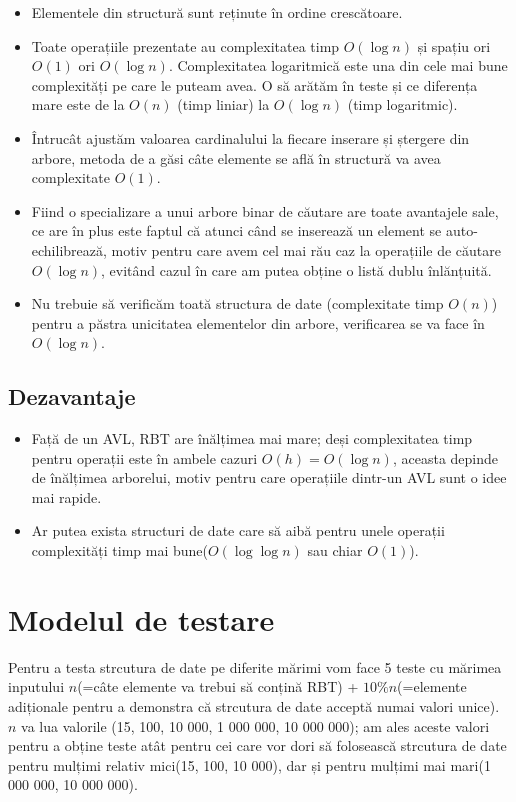 \documentclass[]{report}
\begin{document}
	\begin{itemize}
		\item Elementele din structură sunt reținute în ordine crescătoare.
		\item Toate operațiile prezentate au complexitatea timp $O(\log n)$ și
			spațiu ori $O(1)$ ori $O(\log n)$. Complexitatea logaritmică este una
			din cele mai bune complexități pe care le puteam avea. O să arătăm
			în teste și ce diferența mare este de la $O(n)$ (timp liniar) la
			$O(\log n)$ (timp logaritmic).
		\item Întrucât ajustăm valoarea cardinalului la fiecare inserare și 
			ștergere din arbore, metoda de a găsi câte elemente se află în 
			structură va avea complexitate $O(1)$.
		\item Fiind o specializare a unui arbore binar de căutare are toate
			avantajele sale, ce are în plus este faptul că atunci când se 
			inserează un element se auto-echilibrează, motiv pentru care avem
			cel mai rău caz la operațiile de căutare $O(\log n)$, evitând cazul
			în care am putea obține o listă dublu înlănțuită.
		\item Nu trebuie să verificăm toată structura de date (complexitate timp
			$O(n)$) pentru a păstra unicitatea elementelor din arbore, verificarea
			se va face în $O(\log n)$.
	\end{itemize}

	\section*{Dezavantaje}
	\begin{itemize}
		\item Față de un AVL, RBT are înălțimea mai mare; deși complexitatea
			timp pentru operații este în ambele cazuri $O(h)=O(\log n)$, aceasta
			depinde de înălțimea arborelui, motiv pentru care operațiile
			dintr-un AVL sunt o idee mai rapide.
		\item Ar putea exista structuri de date care să aibă pentru unele operații
			complexități timp mai bune($O(\log\log n)$ sau chiar $O(1)$).
	\end{itemize}

	\chapter*{Modelul de testare}

	Pentru a testa strcutura de date pe diferite mărimi vom face 5 teste cu mărimea
	inputului $n$(=câte elemente va trebui să conțină RBT) + $10\%n$(=elemente
	adiționale pentru a demonstra că strcutura de date acceptă numai valori unice).
	$n$ va lua valorile (15, 100, 10 000, 1 000 000, 10 000 000); am ales
	aceste valori pentru a obține teste atât pentru cei care vor dori să folosească
	strcutura de date pentru mulțimi relativ mici(15, 100, 10 000), dar și pentru
	mulțimi mai mari(1 000 000, 10 000 000).
\end{document}

